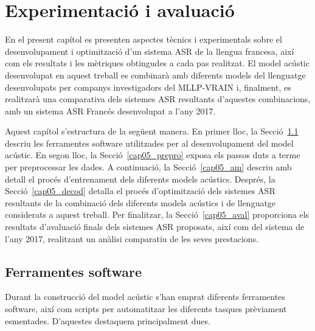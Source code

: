 
\chapter{Experimentació i avaluació}
\label{cap05__}



En el present capítol es presenten aspectes tècnics i experimentals sobre el desenvolupament i optimització d'un sistema ASR de la llengua francesa, així com els resultats i les mètriques obtingudes a cada pas realitzat. El model acústic desenvolupat en aquest treball es combinarà amb diferents models del llenguatge desenvolupats per companys investigadors del MLLP-VRAIN i, finalment, es realitzarà una comparativa dels sistemes ASR resultants d'aquestes combinacions, amb un sistema ASR Francés desenvolupat a l'any 2017.

Aquest capítol s'estructura de la següent manera. En primer lloc, la Secció~\ref{cap05_software} descriu les ferramentes software utilitzades per al desenvolupament del model acústic.
En segon lloc, la Secció~\ref{cap05_prepro} exposa els passos duts a terme per preprocessar les dades.
A continuació, la Secció~\ref{cap05_am} descriu amb detall el procés d'entrenament dels diferents models acústics.
Després, la Secció~\ref{cap05_decod} detalla el procés d'optimització dels sistemes ASR resultants de la combinació dels diferents models acústics i de llenguatge considerats a aquest treball.
Per finalitzar, la Secció~\ref{cap05_aval} proporciona els resultats d'avaluació finals dels sistemes ASR proposats, així com del sistema de l'any 2017, realitzant un anàlisi comparatiu de les seves prestacions.

\section{Ferramentes software}
\label{cap05_software}
Durant la construcció del model acústic s'han emprat diferents ferramentes software, així com scripts per automatitzar les diferents tasques prèviament esmentades. D'aquestes destaquem principalment dues.

